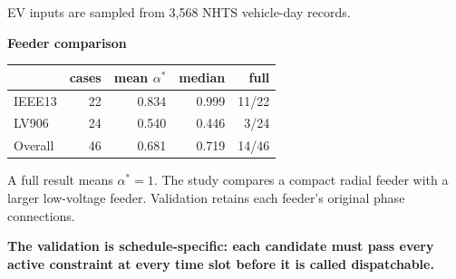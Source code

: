 \documentclass[final]{beamer}
\newcommand{\body}{\fontsize{29}{36}\selectfont}
\newcommand{\bodylarge}{\fontsize{33}{40}\selectfont}
\newcommand{\smallfont}{\fontsize{23}{28}\selectfont}
\begin{document}
\begin{frame}[t]
\begin{tcolorbox}[enhanced,colback=white,colframe=posterNavy,boxrule=2.3pt,
  arc=6pt,left=0.65cm,right=0.65cm,top=0.34cm,bottom=0.34cm]
\begin{minipage}[t]{0.31\linewidth}
    \vspace{0.08cm}
    {\color{posterMuted}\smallfont EV inputs are sampled from 3,568 NHTS vehicle-day records.\par}
  \end{minipage}\hfill
  \begin{minipage}[t]{0.31\linewidth}\vspace{0pt}
    {\color{posterGreen}\fontsize{31}{37}\selectfont\bfseries Feeder comparison\par}
    \vspace{0.10cm}
    \renewcommand{\arraystretch}{1.35}
    \setlength{\tabcolsep}{0.16cm}
    {\fontsize{24}{30}\selectfont
    \begin{tabular}{lrrrr}
      \toprule
      & cases & mean $\alpha^*$ & median & full\\
      \midrule
      IEEE13 & 22 & 0.834 & 0.999 & 11/22\\
      LV906  & 24 & 0.540 & 0.446 & 3/24\\
      Overall& 46 & 0.681 & 0.719 & 14/46\\
      \bottomrule
    \end{tabular}\par}
    \vspace{0.16cm}
    {\color{posterMuted}\body
    A full result means $\alpha^*=1$. The study compares a compact radial feeder with a larger low-voltage feeder. Validation retains each feeder's original phase connections.\par}
  \end{minipage}
  \vspace{0.16cm}
  \begin{tcolorbox}[colback=posterBlueSurface,colframe=posterTeal,boxrule=1.4pt,arc=4pt,
    left=0.35cm,right=0.35cm,top=0.18cm,bottom=0.18cm]
    \centering
    {\color{posterNavy}\bodylarge\bfseries The validation is schedule-specific: each candidate must pass every active constraint at every time slot before it is called dispatchable.\par}
  \end{tcolorbox}
\end{tcolorbox}

\vspace{0.22cm}


\end{frame}
\end{document}
